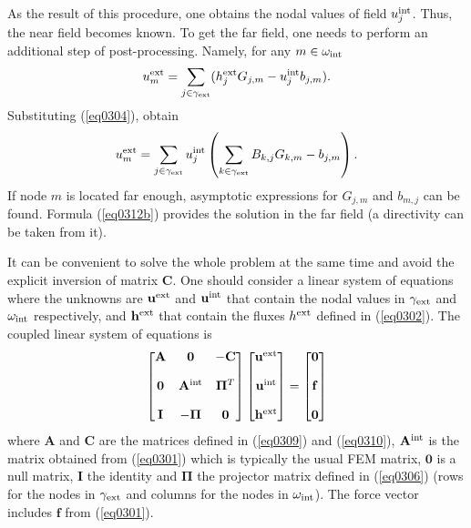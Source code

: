 \documentclass[12pt]{article}
\newcommand{\rin}{{\rm int}}
\newcommand{\rex}{{\rm ext}}
\newcommand{\A}{\mathbf{A}}
\newcommand{\C}{\mathbf{C}}
\newcommand{\matPI}{\mathbf{\Pi}}
\newcommand{\Zero}{\mathbf{0}}
\newcommand{\Id}{\mathbf{I}}
\begin{document}
As the result of this procedure, one obtains the nodal values of field $u_j^\rin$. Thus,
the near field becomes known. To get the far field, one needs to perform an additional step of post-processing.
Namely, for any $m \in \omega_\rin$
\begin{equation}
u_m^\rex = \sum_{j \in \gamma_\rex} (h_j^\rex G_{j,m} - u_j^\rin b_{j,m}).
\label{eq0312a}
\end{equation}
Substituting (\ref{eq0304}), obtain
\begin{equation}
u_m^\rex = \sum_{j \in \gamma_\rex} u_j^\rin
\left(
\sum_{k\in \gamma_\rex} B_{k,j} G_{k,m} -   b_{j,m}
\right).
\label{eq0312b}
\end{equation}
If node $m$ is located far enough, asymptotic expressions for $G_{j,m}$ and $b_{m,j}$ can be found.
Formula (\ref{eq0312b}) provides the solution in the far field (a directivity can be taken from it).

It can be convenient to solve the whole problem at the same time and avoid the explicit inversion of matrix $\C$.
One should consider a linear system of equations where the unknowns are $\mathbf{u}^\rex$ and $\mathbf{u}^\rin$ that contain the nodal values in $\gamma_\rex$ and $\omega_\rin$ respectively, and $\mathbf{h}^\rex$ that contain the fluxes $h^\rex$ defined in (\ref{eq0302}). The coupled linear system of equations is
\begin{equation}\label{eq:CoupledSystem}
\begin{bmatrix}
    \A   & \Zero & -\C \\[2.5ex]
    \Zero  & \A^\rin & \matPI^T\\[2.5ex]
    \Id  & -\matPI & \Zero
\end{bmatrix}
\begin{bmatrix}
 \mathbf{u}^\rex \\[2.5ex]
 \mathbf{u}^\rin \\[2.5ex]
 \mathbf{h}^\rex
\end{bmatrix} =
\begin{bmatrix}
 \Zero \\[2.5ex]
 \mathbf{f} \\[2.5ex]
 \Zero
\end{bmatrix}
\end{equation}
where $\A$ and $\C$ are the matrices defined in (\ref{eq0309}) and  (\ref{eq0310}), $\A^\rin$ is the matrix obtained from (\ref{eq0301}) which is typically the usual FEM matrix, $\Zero$ is a null matrix, $\Id$ the identity and $\matPI$ the projector matrix defined in (\ref{eq0306}) (rows for the nodes in $\gamma_\rex$ and columns for the nodes in $\omega_\rin$). The force vector includes $\mathbf{f}$ from (\ref{eq0301}).
\end{document}
